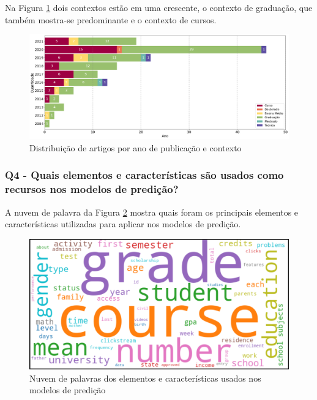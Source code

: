 Na Figura \ref{fig:contexto_ano} dois contextos estão em uma crescente, o contexto de graduação, que também mostra-se predominante e o contexto de cursos.

\begin{figure}[H]
\centering
\includegraphics[width=1\textwidth]{Figuras/contexto_ano.png}
\caption{Distribuição de artigos por ano de publicação e contexto}
\label{fig:contexto_ano}
\end{figure}

\subsubsection{Q4 - Quais elementos e características são usados como recursos nos modelos de predição?}\label{sub:q4}

A nuvem de palavra da Figura \ref{fig:nuvemElementosCaracteristicas} mostra quais foram os principais elementos e características utilizadas para aplicar nos modelos de predição.

\begin{figure}[H]
\centering
\includegraphics[width=1\textwidth]{Figuras/100_palavras_features.png}
\caption{Nuvem de palavras dos elementos e características usados nos modelos de predição}
\label{fig:nuvemElementosCaracteristicas}
\end{figure}

